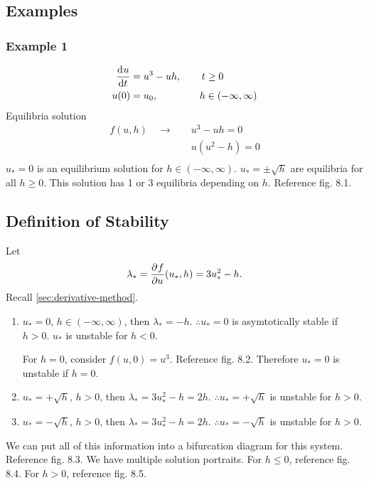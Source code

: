 \documentclass[12pt]{article}
\begin{document}
\subsection{Examples}
\subsubsection*{Example 1}
\begin{equation}
  \begin{aligned}
    \frac{\mathrm{d}^{} {u}}{\mathrm{d}{t}^{}} &= u^3-uh, &\quad t&\ge0 \\
    u(0) &= u_0, &\quad h&\in(-\infty,\infty) \\
  \end{aligned}
\end{equation}
Equilibria solution
\begin{equation}
  \begin{aligned}
    f(u,h) \quad \rightarrow \quad & u^3-uh=0 \\
    & u(u^2-h)=0 \\
  \end{aligned}
\end{equation}
$u_*=0$ is an equilibrium solution for $h\in(-\infty,\infty)$. $u_*=\pm\sqrt{h}$
are equilibria for all $h\ge0$. This solution has 1 or 3 equilibria depending on
$h$. Reference fig. 8.1.

\subsection{Definition of Stability}
Let $$\lambda_*=\frac{\partial^{} {f}}{\partial {u}^{}}(u_*,h)=3u_*^2-h.$$ Recall
\cref{sec:derivative-method}.

\begin{enumerate}
\item $u_*=0$, $h\in(-\infty,\infty)$, then $\lambda_*=-h$.
  $\therefore u_*=0$ is asymtotically stable if $h>0$.
  $u_*$ is unstable for $h<0$.

  For $h=0$, consider $f(u,0)=u^3$. Reference fig. 8.2. Therefore $u_*=0$ is
  unstable if $h=0$.
\item $u_*=+\sqrt{h},\, h>0$, then $\lambda_*=3u_*^2-h=2h$.
  $\therefore u_*=+\sqrt{h}$ is unstable for $h>0$.
\item $u_*=-\sqrt{h},\, h>0$, then $\lambda_*=3u_*^2-h=2h$.
  $\therefore u_*=-\sqrt{h}$ is unstable for $h>0$.
\end{enumerate}

We can put all of this information into a bifurcation diagram for this system.
Reference fig. 8.3. We have multiple solution portraits. For $h\le0$, reference
fig. 8.4. For $h>0$, reference fig. 8.5.
\end{document}
